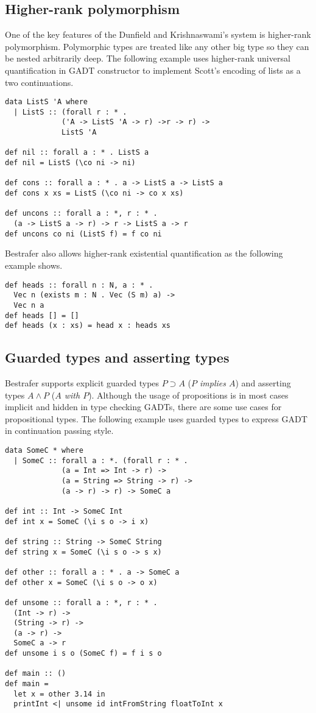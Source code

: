 \documentclass[declaration,shortabstract,english]{iithesis}
\begin{document}
\subsection*{Higher-rank polymorphism}
One of the key features of the Dunfield and Krishnaswami's system is higher-rank polymorphism.
Polymorphic types are treated like any other big type so they can be nested arbitrarily
deep. The following example uses higher-rank universal quantification in GADT constructor
to implement Scott's encoding of lists as a two continuations\cite{rankNtypes}.
\begin{verbatim}
data ListS 'A where
  | ListS :: (forall r : * .
             ('A -> ListS 'A -> r) ->r -> r) ->
             ListS 'A

def nil :: forall a : * . ListS a
def nil = ListS (\co ni -> ni)

def cons :: forall a : * . a -> ListS a -> ListS a
def cons x xs = ListS (\co ni -> co x xs)

def uncons :: forall a : *, r : * .
  (a -> ListS a -> r) -> r -> ListS a -> r
def uncons co ni (ListS f) = f co ni
\end{verbatim}
Bestrafer also allows higher-rank existential quantification as the following example shows.
\begin{verbatim}
def heads :: forall n : N, a : * .
  Vec n (exists m : N . Vec (S m) a) ->
  Vec n a
def heads [] = []
def heads (x : xs) = head x : heads xs
\end{verbatim}

\subsection*{Guarded types and asserting types}
Bestrafer supports explicit guarded types $P \supset A $ (\textit{$P$ implies $A$})
and asserting types $A \wedge  P$ (\textit{$A$ with $P$}).
Although the usage of propositions is in most cases implicit and hidden in type checking GADTs,
there are some use cases for propositional types.
The following example uses guarded types to express GADT in continuation passing style\cite{rankNtypes}.

\begin{verbatim}
data SomeC * where
  | SomeC :: forall a : *. (forall r : * .
             (a = Int => Int -> r) ->
             (a = String => String -> r) ->
             (a -> r) -> r) -> SomeC a

def int :: Int -> SomeC Int
def int x = SomeC (\i s o -> i x)

def string :: String -> SomeC String
def string x = SomeC (\i s o -> s x)

def other :: forall a : * . a -> SomeC a
def other x = SomeC (\i s o -> o x)

def unsome :: forall a : *, r : * .
  (Int -> r) ->
  (String -> r) ->
  (a -> r) ->
  SomeC a -> r
def unsome i s o (SomeC f) = f i s o

def main :: ()
def main =
  let x = other 3.14 in
  printInt <| unsome id intFromString floatToInt x
\end{verbatim}
\end{document}
